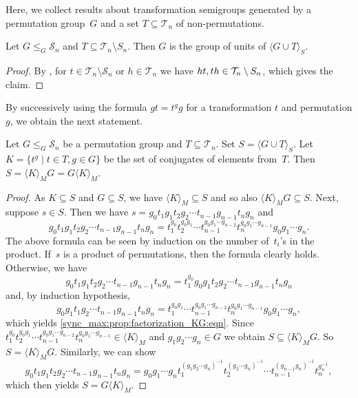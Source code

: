 
Here, we collect results about transformation semigroups generated by a permutation group~$G$ and a set $T \subseteq \mathcal T_n$ of non-permutations.

\begin{proposition}
	\label{prelim:prop:group_of_units}
	Let $G \le_G \mathcal S_n$ and $T \subseteq \mathcal T_n \setminus S_n$. 
	Then $G$ is the group of units of $\langle G \cup T \rangle_S$.
\end{proposition}
\begin{proof}
		By ,
		for $t \in \mathcal T_n \setminus \mathcal S_n$
		or $h \in \mathcal T_n$
		we have $\concat{t}{h}, \concat{h}{t}  \in \mathcal T_n \setminus S_n$,
		which gives the claim.
\end{proof}

By successively using the formula $gt = t^g g$ for a transformation $t$
and permutation $g$, we obtain the next statement.

\begin{proposition} 
	\label{sync_max:prop:factorization_KG}
	Let $G \le_G \mathcal S_n$ be a permutation group and $T \subseteq \mathcal T_n$. 
	Set $S = \langle G \cup T \rangle_S$. Let~$K = \{ t^g \mid t \in T, g \in G \}$ be the set of conjugates of elements from~$T$.
	Then $S = \langle K \rangle_M G = G \langle K \rangle_M$.
\end{proposition}
\begin{proof}
	As $K \subseteq S$ and $G \subseteq S$,
	we have $\langle K \rangle_M \subseteq S$
	and so also $\langle K \rangle_M G \subseteq S$.
	Next, suppose $s \in S$. Then we have $s = g_0 t_1 g_1 t_2 g_2 \cdots t_{n-1} g_{n-1} t_n g_n$
	and 
	\begin{equation} \label{sync_max:prop:factorization_KG:eqn}
		g_0 t_1 g_1 t_2 g_2 \cdots t_{n-1} g_{n-1} t_n g_n 
		= t_1^{g_0} t_2^{g_0 g_1} \cdots t_{n-1}^{g_0 g_1 \cdots g_{n-2}} t_n^{g_0 g_1 \cdots g_{n-1}} g_0 g_1 \cdots g_n.
	\end{equation}	
	The above formula can be seen by induction on the number of~$t_i$'s
	in the product. If~$s$ is a product of permutations, then 
	the formula clearly holds.
	Otherwise,
	we have 
	\[ 
	g_0 t_1 g_1 t_2 g_2 \cdots t_{n-1} g_{n-1} t_n g_n 
	= t_1^{g_0} g_0 g_1 t_2 g_2 \cdots t_{n-1} g_{n-1} t_n g_n
	\]
	and, by induction hypothesis,
	\[
	g_0 g_1 t_1 g_2 \cdots t_{n-1} g_{n-1} t_n g_n = t_1^{g_0 g_1} \cdots t_{n-1}^{g_0 g_1 \cdots g_{n-2}} t_n^{g_0 g_1 \cdots g_{n-1}} g_0 g_1 \cdots g_n,
	\]
	which yields \cref{sync_max:prop:factorization_KG:eqn}.
	Since $t_1^{g_0} t_2^{g_0 g_1} \cdots t_{n-1}^{g_0 g_1 \cdots g_{n-2}} t_n^{g_0 g_1 \cdots g_{n-1}} \in \langle K \rangle_M$
	and $g_1 g_2 \cdots g_n \in G$
	we obtain $S \subseteq \langle K \rangle_M G$. So $S = \langle K \rangle_M G$.
	Similarly, we can show
	\[
	 g_0 t_1 g_1 t_2 g_2 \cdots t_{n-1} g_{n-1} t_n g_n 
	 = g_0 g_1 \cdots g_n t_1^{(g_1 g_2 \cdots g_n)^{-1}} t_2^{(g_2 \cdots g_n)^{-1}} \cdots t_{n-1}^{(g_{n-1} g_n)^{-1}} t_n^{g_n^{-1}},
	\]
	which then yields $S = G \langle K \rangle_M$.		
\end{proof}


